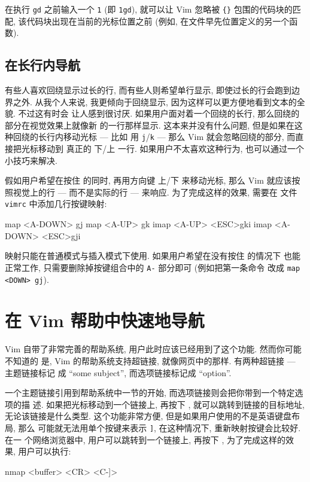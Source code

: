 \begin{tips}
    在执行 \texttt{gd} 之前输入一个 \texttt{1} (即 \texttt{1gd}), 就可以让 Vim
    忽略被 \verb'{}' 包围的代码块的匹配, 该代码块出现在当前的光标位置之前
    (例如, 在文件早先位置定义的另一个函数).
\end{tips}

\subsection{在长行内导航}
\label{subsec:navigating_long_lines}

有些人喜欢回绕显示过长的行, 而有些人则希望单行显示, 即使过长的行会跑到边界之外.
从我个人来说, 我更倾向于回绕显示, 因为这样可以更方便地看到文本的全貌. 不过这有时会
让人感到很讨厌. 如果用户面对着一个回绕的长行, 那么回绕的部分在视觉效果上就像新
的一行那样显示. 这本来并没有什么问题, 但是如果在这种回绕的长行内移动光标 --- 比如
用 \texttt{j}/\texttt{k} --- 那么 Vim 就会忽略回绕的部分, 而直接把光标移动到
真正的 下/上 一行. 如果用户不太喜欢这种行为, 也可以通过一个小技巧来解决.

假如用户希望在按住  的同时, 再用方向键 上/下 来移动光标, 那么 Vim
就应该按照视觉上的行 --- 而不是实际的行 --- 来响应. 为了完成这样的效果, 需要在
文件 \texttt{vimrc} 中添加几行按键映射:
\begin{vimcode}
map <A-DOWN> gj
map <A-UP> gk
imap <A-UP> <ESC>gki
imap <A-DOWN> <ESC>gji
\end{vimcode}

映射只能在普通模式与插入模式下使用. 如果用户希望在没有按住  的情况下
也能正常工作, 只需要删除掉按键组合中的 \texttt{A-} 部分即可 (例如把第一条命令
改成 \texttt{map <DOWN> gj}).

\section{在 Vim 帮助中快速地导航}
\label{sec:faster_navigation_in_vim_help}

Vim 自带了非常完善的帮助系统, 用户此时应该已经用到了这个功能. 然而你可能不知道的
是, Vim 的帮助系统支持超链接, 就像网页中的那样. 有两种超链接 --- 主题链接标记
成 ``some subject'', 而选项链接标记成 ``option''.

一个主题链接引用到帮助系统中一节的开始, 而选项链接则会把你带到一个特定选项的描
述. 如果把光标移动到一个链接上, 再按下 \key{Ctrl+]}, 就可以跳转到链接的目标地址,
无论该链接是什么类型. 这个功能非常方便, 但是如果用户使用的不是英语键盘布局, 那么
可能就无法用单个按键来表示 \texttt{]}, 在这种情况下, 重新映射按键会比较好. 在一
个网络浏览器中, 用户可以跳转到一个链接上, 再按下 , 为了完成这样的效
果, 用户可以执行:
\begin{vimcode}
nmap <buffer> <CR> <C-]>
\end{vimcode}

